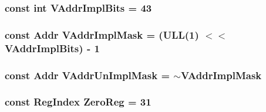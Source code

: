\label{namespaceAlphaISA_a42b44a1d23d813c474aef63cd9c7a729}
\hypertarget{namespaceAlphaISA_a5ce0fab4a9e923e190218b6d12207a9d}{
\subsubsection[{VAddrImplBits}]{\setlength{\rightskip}{0pt plus 5cm}const int {\bf VAddrImplBits} = 43}}
\label{namespaceAlphaISA_a5ce0fab4a9e923e190218b6d12207a9d}
\hypertarget{namespaceAlphaISA_a3d31b41fa4d20dbbd91b61d7df201ac9}{
\subsubsection[{VAddrImplMask}]{\setlength{\rightskip}{0pt plus 5cm}const {\bf Addr} {\bf VAddrImplMask} = (ULL(1) $<$$<$ {\bf VAddrImplBits}) -\/ 1}}
\label{namespaceAlphaISA_a3d31b41fa4d20dbbd91b61d7df201ac9}
\hypertarget{namespaceAlphaISA_abf1ec857b893186376e563b0da26ec1b}{
\subsubsection[{VAddrUnImplMask}]{\setlength{\rightskip}{0pt plus 5cm}const {\bf Addr} {\bf VAddrUnImplMask} = $\sim${\bf VAddrImplMask}}}
\label{namespaceAlphaISA_abf1ec857b893186376e563b0da26ec1b}
\hypertarget{namespaceAlphaISA_a38e079cf64d8a3ced6ce8e52ce269a5e}{
\subsubsection[{ZeroReg}]{\setlength{\rightskip}{0pt plus 5cm}const {\bf RegIndex} {\bf ZeroReg} = 31}}
\label{namespaceAlphaISA_a38e079cf64d8a3ced6ce8e52ce269a5e}
